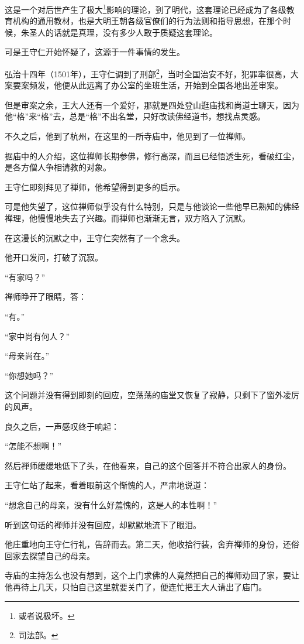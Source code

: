 \begin{multicols}{\theparacolNo}
		这是一个对后世产生了极大\footnote{或者说极坏。}影响的理论，到了明代，这套理论已经成为了各级教育机构的通用教材，也是大明王朝各级官僚们的行为法则和指导思想，在那个时候，朱圣人的话就是真理，没有多少人敢于质疑这套理论。

		可是王守仁开始怀疑了，这源于一件事情的发生。

		弘治十四年（1501年），王守仁调到了刑部\footnote{司法部。}，当时全国治安不好，犯罪率很高，大案要案频发，他便从此远离了办公室的坐班生活，开始到全国各地出差审案。

		但是审案之余，王大人还有一个爱好，那就是四处登山逛庙找和尚道士聊天，因为他“格”来“格”去，总是“格”不出名堂，只好改读佛经道书，想找点灵感。

		不久之后，他到了杭州，在这里的一所寺庙中，他见到了一位禅师。

		据庙中的人介绍，这位禅师长期参佛，修行高深，而且已经悟透生死，看破红尘，是各方僧人争相请教的对象。

		王守仁即刻拜见了禅师，他希望得到更多的启示。

		可是他失望了，这位禅师似乎没有什么特别，只是与他谈论一些他早已熟知的佛经禅理，他慢慢地失去了兴趣。而禅师也渐渐无言，双方陷入了沉默。

		在这漫长的沉默之中，王守仁突然有了一个念头。

		他开口发问，打破了沉寂。

		“有家吗？”

		禅师睁开了眼睛，答：

		“有。”

		“家中尚有何人？”

		“母亲尚在。”

		“你想她吗？”

		这个问题并没有得到即刻的回应，空荡荡的庙堂又恢复了寂静，只剩下了窗外凌厉的风声。

		良久之后，一声感叹终于响起：

		“怎能不想啊！”

		然后禅师缓缓地低下了头，在他看来，自己的这个回答并不符合出家人的身份。

		王守仁站了起来，看着眼前这个惭愧的人，严肃地说道：

		“想念自己的母亲，没有什么好羞愧的，这是人的本性啊！”

		听到这句话的禅师并没有回应，却默默地流下了眼泪。

		他庄重地向王守仁行礼，告辞而去。第二天，他收拾行装，舍弃禅师的身份，还俗回家去探望自己的母亲。

		寺庙的主持怎么也没有想到，这个上门求佛的人竟然把自己的禅师劝回了家，要让他再待上几天，只怕自己这里就要关门了，便连忙把王大人请出了庙门。


\end{multicols}
